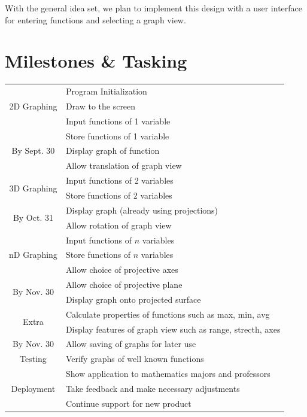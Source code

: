 \documentclass{article}
\newlength{\headerwidth}
\begin{document}
{With the general idea set, we plan to implement this design with a 
user interface for entering functions and selecting a graph view.

\newpage
\section{Milestones \& Tasking}
\begin{tabularx}{\headerwidth}{|c|X|} 
	\hline
	\multirow{3}{*}{ 2D Graphing } & Program Initialization \\
								   & Draw to the screen \\
								   & Input functions of 1 variable \\
	\multirow{3}{*}{ By Sept. 30 } & Store functions of 1 variable \\
								   & Display graph of function \\
								   & Allow translation of graph view \\
	\hline
	\multirow{2}{*}{ 3D Graphing } & Input functions of 2 variables \\
								   & Store functions of 2 variables \\
	\multirow{2}{*}{ By Oct. 31 }  & Display graph (already using projections) \\
								   & Allow rotation of graph view \\ 
	\hline
	\multirow{3}{*}{ nD Graphing } & Input functions of $n$ variables \\
								   & Store functions of $n$ variables \\
								   & Allow choice of projective axes \\
	\multirow{2}{*}{ By Nov. 30 }  & Allow choice of projective plane \\
								   & Display graph onto projected surface \\
	\hline
	\multirow{2}{*}{ Extra } & Calculate properties of functions such as max, min, avg \\
	                         & Display features of graph view such as range, strecth, axes \\
	By Nov. 30				 & Allow saving of graphs for later use \\
	\hline
	Testing & Verify graphs of well known functions \\
	\hline
	\multirow{3}{*}{ Deployment } & Show application to mathematics majors and professors \\
								  & Take feedback and make necessary adjustments \\
								  & Continue support for new product \\
	\hline
\end{tabularx}

}
\end{document}
